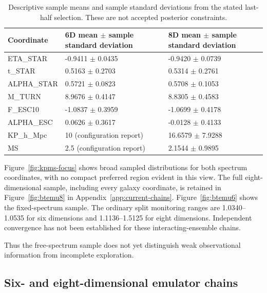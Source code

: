 \begin{table}[t]
\caption{Descriptive sample means and sample standard deviations from the stated last-half selection. These are not accepted posterior constraints.}
\label{tab:chain-moments}
\centering\small
\begin{tabular}{p{}p{}p{}}
\toprule
Coordinate & 6D mean \(\pm\) sample standard deviation & 8D mean \(\pm\) sample standard deviation \\
\midrule
ETA\_STAR & -0.9411 \(\pm\) 0.0435 & -0.9420 \(\pm\) 0.0739 \\
t\_STAR & 0.5163 \(\pm\) 0.2703 & 0.5314 \(\pm\) 0.2761 \\
ALPHA\_STAR & 0.5721 \(\pm\) 0.0823 & 0.5708 \(\pm\) 0.1053 \\
M\_TURN & 8.9676 \(\pm\) 0.4147 & 8.8305 \(\pm\) 0.4583 \\
F\_ESC10 & -1.0837 \(\pm\) 0.3959 & -1.0699 \(\pm\) 0.4178 \\
ALPHA\_ESC & 0.0626 \(\pm\) 0.3617 & -0.0128 \(\pm\) 0.4133 \\
KP\_h\_Mpc & 10 (configuration report) & 16.6579 \(\pm\) 7.9288 \\
MS & 2.5 (configuration report) & 2.1544 \(\pm\) 0.9895 \\
\bottomrule
\end{tabular}
\end{table}

Figure~\ref{fig:kpms-focus} shows broad sampled distributions for both spectrum coordinates, with no compact preferred region evident in this view. The full eight-dimensional sample, including every galaxy coordinate, is retained in Figure~\ref{fig:btemu8} in Appendix~\ref{app:current-chains}. Figure~\ref{fig:btemu6} shows the fixed-spectrum sample. The ordinary split monitoring ranges are 1.0340--1.0535 for six dimensions and 1.1136--1.5125 for eight dimensions. Independent convergence has not been established for these interacting-ensemble chains.

Thus the free-spectrum sample does not yet distinguish weak observational information from incomplete exploration.




\subsection{Six- and eight-dimensional emulator chains}\label{new-six--and-eight-dimensional-emulator-chains}

